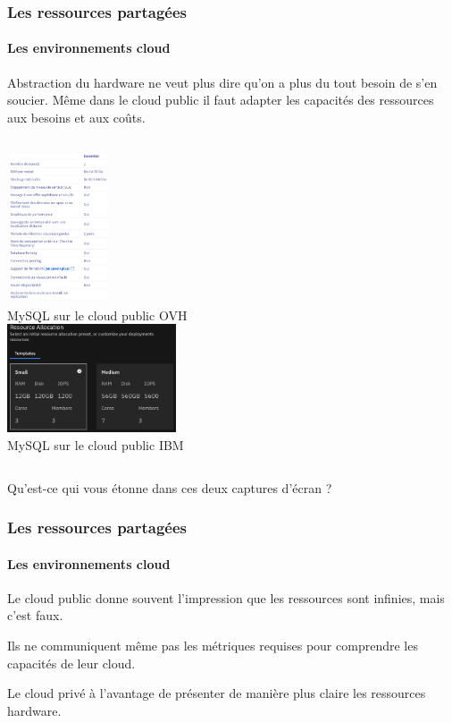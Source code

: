 \documentclass{beamer}
\begin{document}
    \begin{frame}
        \transdissolve
        \frametitle{Les ressources partagées}
        \framesubtitle{Les environnements cloud}
        \begin{dangercolorbox}
            Abstraction du hardware ne veut plus dire qu'on a plus du tout besoin de s'en soucier.
            Même dans le cloud public il faut adapter les capacités des ressources aux besoins et aux coûts.
        \end{dangercolorbox}
        \begin{columns}
            \centering
            \includegraphics[width=3cm]{image/ovh-public-mysql} \\ MySQL sur le cloud public OVH \\
            \centering
            \includegraphics[width=5cm]{image/ibm-public-mysql} \\ MySQL sur le cloud public IBM \\
        \end{columns}
        \flushleft
        \bigbreak
        Qu'est-ce qui vous étonne dans ces deux captures d'écran ?
    \end{frame}

    \begin{frame}
        \transdissolve
        \frametitle{Les ressources partagées}
        \framesubtitle{Les environnements cloud}

        Le cloud public donne souvent l'impression que les ressources sont infinies, mais c'est faux.

        Ils ne communiquent même pas les métriques requises pour comprendre les capacités de leur cloud.

        \bigbreak
        Le cloud privé à l'avantage de présenter de manière plus claire les ressources hardware.
    \end{frame}
\end{document}
